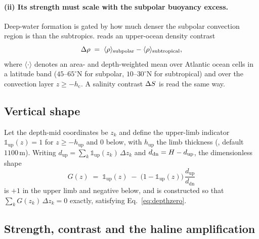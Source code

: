 \paragraph{(ii) Its strength must scale with the subpolar buoyancy excess.}
Deep-water formation is gated by how much denser the subpolar convection region
is than the subtropics. \model{} reads an upper-ocean density contrast
\begin{equation}
  \Delta\rho \;=\; \langle\rho\rangle_{\mathrm{subpolar}} - \langle\rho\rangle_{\mathrm{subtropical}},
  \label{eq:drho}
\end{equation}
where $\langle\cdot\rangle$ denotes an area- and depth-weighted mean over Atlantic
ocean cells in a latitude band ($45$--$65^{\circ}\mathrm{N}$ for subpolar,
$10$--$30^{\circ}\mathrm{N}$ for subtropical) and over the convection layer
$z \ge -h_{\mathrm{c}}$. A salinity contrast $\Delta S$ is read the same way.

\subsection{Vertical shape}

Let the depth-mid coordinates be $z_k$ and define the upper-limb indicator
$\mathbb{1}_{\mathrm{up}}(z) = 1$ for $z \ge -h_{\mathrm{up}}$ and $0$ below, with
$h_{\mathrm{up}}$ the limb thickness (, default $1100\,\mathrm{m}$).
Writing $d_{\mathrm{up}}=\sum_k \mathbb{1}_{\mathrm{up}}(z_k)\,\Delta z_k$ and
$d_{\mathrm{dn}}=H-d_{\mathrm{up}}$, the dimensionless shape
\begin{equation}
  G(z) \;=\; \mathbb{1}_{\mathrm{up}}(z)
            \;-\;\bigl(1-\mathbb{1}_{\mathrm{up}}(z)\bigr)\,\frac{d_{\mathrm{up}}}{d_{\mathrm{dn}}}
  \label{eq:Gshape}
\end{equation}
is $+1$ in the upper limb and negative below, and is constructed so that
$\sum_k G(z_k)\,\Delta z_k = 0$ exactly, satisfying Eq.~\eqref{eq:depthzero}.

\subsection{Strength, contrast and the haline amplification}

